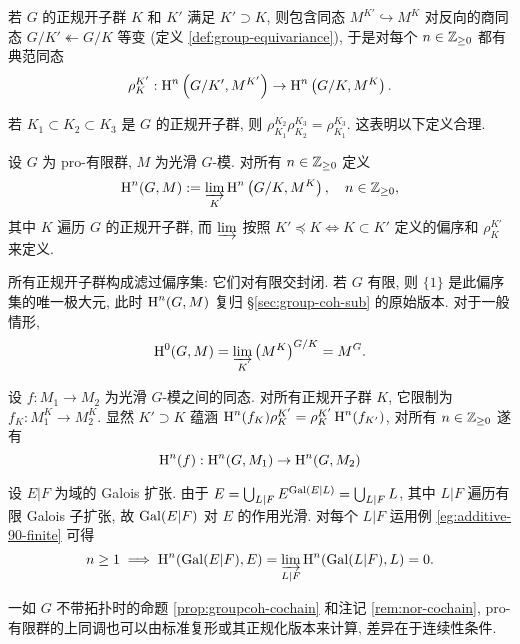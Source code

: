 若 $G$ 的正规开子群 $K$ 和 $K'$ 满足 $K' \supset K$, 则包含同态 $M^{K'} \hookrightarrow M^K$ 对反向的商同态 $G/K' \twoheadleftarrow G/K$ 等变 (定义 \ref{def:group-equivariance}), 于是对每个 $n \in \mathbb{Z}_{\geq 0}$ 都有典范同态
\[ \rho^{K'}_K: \operatorname{H}^n\left(G/K', M^{K'} \right) \to \operatorname{H}^n\left( G/K, M^K \right). \]

若 $K_1 \subset K_2 \subset K_3$ 是 $G$ 的正规开子群, 则 $\rho^{K_2}_{K_1} \rho^{K_3}_{K_2} = \rho^{K_3}_{K_1}$. 这表明以下定义合理.

\begin{definition}
	设 $G$ 为 pro-有限群, $M$ 为光滑 $G$-模. 对所有 $n \in \mathbb{Z}_{\geq 0}$ 定义
	\[ \operatorname{H}^n(G, M) := \varinjlim_K \operatorname{H}^n\left(G/K, M^K \right), \quad n \in \mathbb{Z}_{\geq 0}, \]
	其中 $K$ 遍历 $G$ 的正规开子群, 而 $\varinjlim$ 按照 $K' \preceq K \iff K \subset K'$ 定义的偏序和 $\rho^{K'}_K$ 来定义.
\end{definition}

所有正规开子群构成滤过偏序集: 它们对有限交封闭. 若 $G$ 有限, 则 $\{1\}$ 是此偏序集的唯一极大元, 此时 $\operatorname{H}^n(G, M)$ 复归 \S\ref{sec:group-coh-sub} 的原始版本. 对于一般情形,
\[ \operatorname{H}^0(G, M) = \varinjlim_K \left(M^K\right)^{G/K} = M^G. \]

设 $f: M_1 \to M_2$ 为光滑 $G$-模之间的同态. 对所有正规开子群 $K$, 它限制为 $f_K: M_1^K \to M_2^K$. 显然 $K' \supset K$ 蕴涵 $\operatorname{H}^n(f_K) \rho^{K'}_K = \rho^{K'}_K \operatorname{H}^n(f_{K'})$, 对所有 $n \in \mathbb{Z}_{\geq 0}$ 遂有
\[ \operatorname{H}^n(f): \operatorname{H}^n(G, M_1) \to \operatorname{H}^n(G, M_2) \]

\begin{example}
	设 $E|F$ 为域的 Galois 扩张. 由于 $E = \bigcup_{L|F} E^{\operatorname{Gal}(E|L)} = \bigcup_{L|F} L$, 其中 $L|F$ 遍历有限 Galois 子扩张, 故 $\operatorname{Gal}(E|F)$ 对 $E$ 的作用光滑. 对每个 $L|F$ 运用例 \ref{eg:additive-90-finite} 可得
	\[ n \geq 1 \implies \operatorname{H}^n(\operatorname{Gal}(E|F), E) = \varinjlim_{L|F} \operatorname{H}^n(\operatorname{Gal}(L|F), L) = 0. \]
\end{example}

一如 $G$ 不带拓扑时的命题 \ref{prop:groupcoh-cochain} 和注记 \ref{rem:nor-cochain}, pro-有限群的上同调也可以由标准复形或其正规化版本来计算, 差异在于连续性条件.

